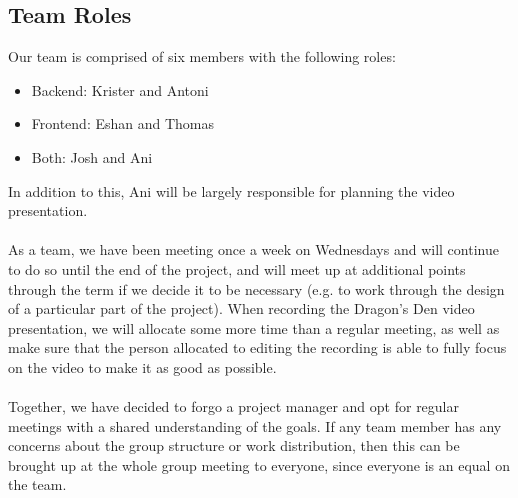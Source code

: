 \documentclass{article}
\begin{document}
\subsection{Team Roles}
Our team is comprised of six members with the following roles:
\begin{itemize}
    \item Backend: Krister and Antoni
    \item Frontend: Eshan and Thomas
    \item Both: Josh and Ani
\end{itemize}
In addition to this, Ani will be largely responsible for planning the video presentation.\\\\
As a team, we have been meeting once a week on Wednesdays and will continue to do 
so until the end of the project, and will meet up at additional points through the term if we decide it to be necessary 
(e.g. to work through the design of a particular part of the project). When recording the Dragon's 
Den video presentation, we will allocate some more time than a regular meeting, as well as make sure that 
the person allocated to editing the recording is able to fully focus on the video to make it as good as possible.\\\\
Together, we have decided to forgo a project manager and opt for regular meetings 
with a shared understanding of the goals. If any team member has any concerns about the group 
structure or work distribution, then this can be brought up at the whole group meeting 
to everyone, since everyone is an equal on the team.
\end{document}
